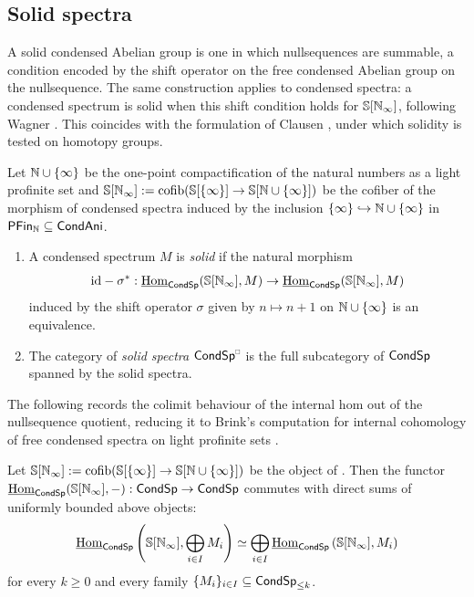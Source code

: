 \subsection{Solid spectra}\label{subsec: solid spectra}
A solid condensed Abelian group is one in which nullsequences are summable, a condition encoded by the shift operator on the free condensed Abelian group on the nullsequence. The same construction applies to condensed spectra: a condensed spectrum is solid when this shift condition holds for $\mathbb{S}[\mathbb{N}_{\infty}]$, following Wagner \cite[\S B.6]{WagnerHHab}. This coincides with the formulation of Clausen \cite[Def. 13.2]{ClausenLie}, under which solidity is tested on homotopy groups.
\begin{definition}\label{def: solid spectra}
    Let $\mathbb{N}\cup\{\infty\}$ be the one-point compactification of the natural numbers as a light profinite set and $\mathbb{S}[\mathbb{N}_{\infty}]:=\mathrm{cofib}(\mathbb{S}[\{\infty\}]\to\mathbb{S}[\mathbb{N}\cup\{\infty\}])$ be the cofiber of the morphism of condensed spectra induced by the inclusion $\{\infty\}\hookrightarrow\mathbb{N}\cup\{\infty\}$ in $\mathsf{PFin}_{\mathbb{N}}\subseteq\mathsf{Cond}\mathsf{Ani}$. 
    \begin{enumerate}
        \item A condensed spectrum $M$ is \emph{solid} if the natural morphism 
        $$\mathrm{id}-\sigma^{*}:\underline{\mathrm{Hom}}_{\mathsf{Cond}\mathsf{Sp}}(\mathbb{S}[\mathbb{N}_{\infty}],M)\to\underline{\mathrm{Hom}}_{\mathsf{Cond}\mathsf{Sp}}(\mathbb{S}[\mathbb{N}_{\infty}],M)$$
        induced by the shift operator $\sigma$ given by $n\mapsto n+1$ on $\mathbb{N}\cup\{\infty\}$ is an equivalence. 
        \item The category of \emph{solid spectra} $\Cond\Sp^{\sld}$ is the full subcategory of $\mathsf{Cond}\mathsf{Sp}$ spanned by the solid spectra. 
    \end{enumerate}
\end{definition}
The following records the colimit behaviour of the internal hom out of the nullsequence quotient, reducing it to Brink's computation for internal cohomology of free condensed spectra on light profinite sets \cite[Lem. 2.7.1]{BrinkCondensed}.
\begin{lemma}\label{lem: Brink internal cohomology}
    Let $\mathbb{S}[\mathbb{N}_{\infty}]:=\mathrm{cofib}(\mathbb{S}[\{\infty\}]\to\mathbb{S}[\mathbb{N}\cup\{\infty\}])$ be the object of . Then the functor $\underline{\mathrm{Hom}}_{\mathsf{Cond}\mathsf{Sp}}(\mathbb{S}[\mathbb{N}_{\infty}],-):\mathsf{Cond}\mathsf{Sp}\to\mathsf{Cond}\mathsf{Sp}$ commutes with direct sums of uniformly bounded above objects: 
    $$\underline{\mathrm{Hom}}_{\mathsf{Cond}\mathsf{Sp}}\left(\mathbb{S}[\mathbb{N}_{\infty}],\bigoplus_{i\in I}M_{i}\right)\simeq\bigoplus_{i\in I}\underline{\mathrm{Hom}}_{\mathsf{Cond}\mathsf{Sp}}\left(\mathbb{S}[\mathbb{N}_{\infty}],M_{i}\right)$$
    for every $k\geq0$ and every family $\{M_{i}\}_{i\in I}\subseteq\mathsf{Cond}\mathsf{Sp}_{\leq k}$. 
\end{lemma}

